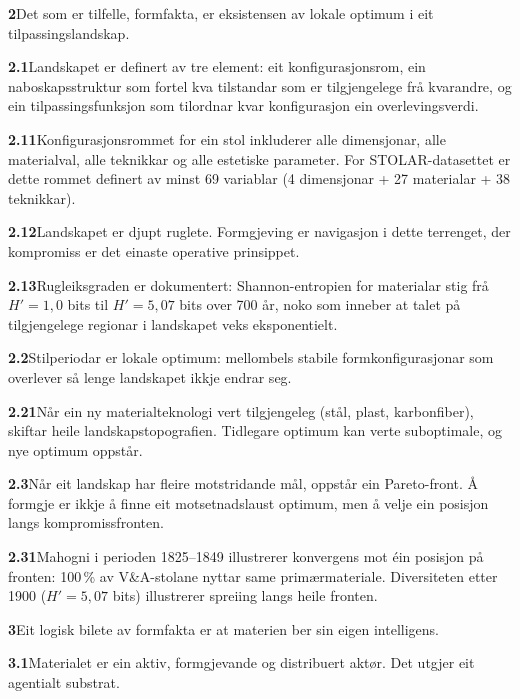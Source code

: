 \documentclass[12pt, a4paper]{article}
\begin{document}
\bigskip

\noindent\textbf{2}\quad Det som er tilfelle, formfakta, er eksistensen av lokale optimum i eit tilpassingslandskap.

\medskip
\noindent\textbf{2.1}\quad Landskapet er definert av tre element: eit konfigurasjonsrom, ein naboskapsstruktur som fortel kva tilstandar som er tilgjengelege frå kvarandre, og ein tilpassingsfunksjon som tilordnar kvar konfigurasjon ein overlevingsverdi.

\medskip
\noindent\textbf{2.11}\quad Konfigurasjonsrommet for ein stol inkluderer alle dimensjonar, alle materialval, alle teknikkar og alle estetiske parameter. For STOLAR-datasettet er dette rommet definert av minst 69 variablar (4 dimensjonar + 27 materialar + 38 teknikkar).

\medskip
\noindent\textbf{2.12}\quad Landskapet er djupt ruglete. Formgjeving er navigasjon i dette terrenget, der kompromiss er det einaste operative prinsippet.

\medskip
\noindent\textbf{2.13}\quad Rugleiksgraden er dokumentert: Shannon-entropien for materialar stig frå $H' = 1{,}0$ bits til $H' = 5{,}07$ bits over 700 år, noko som inneber at talet på tilgjengelege regionar i landskapet veks eksponentielt.

\medskip
\noindent\textbf{2.2}\quad Stilperiodar er lokale optimum: mellombels stabile formkonfigurasjonar som overlever så lenge landskapet ikkje endrar seg.

\medskip
\noindent\textbf{2.21}\quad Når ein ny materialteknologi vert tilgjengeleg (stål, plast, karbonfiber), skiftar heile landskapstopografien. Tidlegare optimum kan verte suboptimale, og nye optimum oppstår.

\medskip
\noindent\textbf{2.3}\quad Når eit landskap har fleire motstridande mål, oppstår ein Pareto-front. Å formgje er ikkje å finne eit motsetnadslaust optimum, men å velje ein posisjon langs kompromissfronten.

\medskip
\noindent\textbf{2.31}\quad Mahogni i perioden 1825--1849 illustrerer konvergens mot éin posisjon på fronten: 100\,\% av V\&A-stolane nyttar same primærmateriale. Diversiteten etter 1900 ($H' = 5{,}07$ bits) illustrerer spreiing langs heile fronten.

\bigskip

\noindent\textbf{3}\quad Eit logisk bilete av formfakta er at materien ber sin eigen intelligens.

\medskip
\noindent\textbf{3.1}\quad Materialet er ein aktiv, formgjevande og distribuert aktør. Det utgjer eit agentialt substrat.
\end{document}
